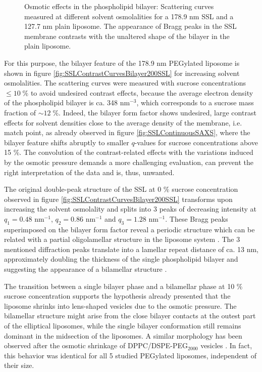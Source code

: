 \begin{figure}
	\centering
		\subfloat[PEG 178.9 nm]{\resizebox{0.44\linewidth}{!}{}\label{fig:SSLContrastCurvesBilayer200SSL}}
		\subfloat[Plain 127.7 nm]{\resizebox{0.44\linewidth}{!}{}\label{fig:SSLContrastCurvesBilayer100Plain}}
		\caption{Osmotic effects in the phospholipid bilayer: Scattering curves measured at different solvent osmolalities for a 178.9 nm SSL and a 127.7 nm plain liposome. The appearance of Bragg peaks in the SSL membrane contrasts with the unaltered shape of the bilayer in the plain liposome.}
\end{figure}

For this purpose, the bilayer feature of the 178.9 nm PEGylated liposome is shown in figure \ref{fig:SSLContrastCurvesBilayer200SSL} for increasing solvent osmolalities. The scattering curves were measured with sucrose concentrations $\leq10\;\%$ to avoid undesired contrast effects, because the average electron density of the phospholipid bilayer is ca. 348 nm$^{-3}$, which corresponds to a sucrose mass fraction of $\sim 12 \; \%$. Indeed, the bilayer form factor shows undesired, large contrast effects for solvent densities close to the average density of the membrane, i.e. match point, as already observed in figure \ref{fig:SSLContinuousSAXS}, where the bilayer feature shifts abruptly to smaller $q$-values for sucrose concentrations above 15 $\%$. The convolution of the contrast-related effects with the variations induced by the osmotic pressure demands a more challenging evaluation, can prevent the right interpretation of the data and is, thus, unwanted.

The original double-peak structure of the SSL at 0 $\%$ sucrose concentration observed in figure \ref{fig:SSLContrastCurvesBilayer200SSL} transforms upon increasing the solvent osmolality and splits into 3 peaks of decreasing intensity at $q_1=0.48$ nm$^{-1}$, $q_2=0.86$ nm$^{-1}$ and $q_3=1.28$ nm$^{-1}$. These Bragg peaks superimposed on the bilayer form factor reveal a periodic structure which can be related with a partial oligolamellar structure in the liposome system \cite{fernandez_influence_2008}. The 3 mentioned diffraction peaks translate into a lamellar repeat distance of ca. 13 nm, approximately doubling the thickness of the single phospholipid bilayer \cite{kenworthy_range_1995} and suggesting the appearance of a bilamellar structure \cite{deme_giant_2002}. 

The transition between a single bilayer phase and a bilamellar phase at 10 $\%$ sucrose concentration supports the hypothesis already presented that the liposome shrinks into lens-shaped vesicles due to the osmotic pressure. The bilamellar structure might arise from the close bilayer contacts at the outest part of the elliptical liposomes, while the single bilayer conformation still remains dominant in the midsection of the liposomes. A similar morphology has been observed after the osmotic shrinkage of DPPC/DSPE-PEG$_{2000}$ vesicles \cite{terreno_osmotically_2009}. In fact, this behavior was identical for all 5 studied PEGylated liposomes, independent of their size. 

